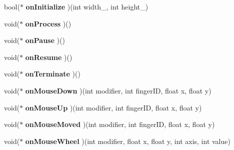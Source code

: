 \begin{DoxyCompactItemize}
\item 
bool($\ast$ {\bfseries on\+Initialize} )(int width\+\_\+, int height\+\_\+)\hypertarget{class_i_dream_sky_1_1_game_descriptor_a811074b2e3af8b6f2796cc12e2262558}{}\label{class_i_dream_sky_1_1_game_descriptor_a811074b2e3af8b6f2796cc12e2262558}

\item 
void($\ast$ {\bfseries on\+Process} )()\hypertarget{class_i_dream_sky_1_1_game_descriptor_a3cd631f41475569742acc622292d93b2}{}\label{class_i_dream_sky_1_1_game_descriptor_a3cd631f41475569742acc622292d93b2}

\item 
void($\ast$ {\bfseries on\+Pause} )()\hypertarget{class_i_dream_sky_1_1_game_descriptor_acfe288cb8ddebbda45ffce43866c4f3b}{}\label{class_i_dream_sky_1_1_game_descriptor_acfe288cb8ddebbda45ffce43866c4f3b}

\item 
void($\ast$ {\bfseries on\+Resume} )()\hypertarget{class_i_dream_sky_1_1_game_descriptor_a9b575075c02bb6d9798887bf6fd1f018}{}\label{class_i_dream_sky_1_1_game_descriptor_a9b575075c02bb6d9798887bf6fd1f018}

\item 
void($\ast$ {\bfseries on\+Terminate} )()\hypertarget{class_i_dream_sky_1_1_game_descriptor_a7265208792f533b42f68c478bac32feb}{}\label{class_i_dream_sky_1_1_game_descriptor_a7265208792f533b42f68c478bac32feb}

\item 
void($\ast$ {\bfseries on\+Mouse\+Down} )(int modifier, int finger\+ID, float x, float y)\hypertarget{class_i_dream_sky_1_1_game_descriptor_a827fde2a04858244047b43a227ddae04}{}\label{class_i_dream_sky_1_1_game_descriptor_a827fde2a04858244047b43a227ddae04}

\item 
void($\ast$ {\bfseries on\+Mouse\+Up} )(int modifier, int finger\+ID, float x, float y)\hypertarget{class_i_dream_sky_1_1_game_descriptor_a8dc9aaed3344af080aff7763c3e1f2f8}{}\label{class_i_dream_sky_1_1_game_descriptor_a8dc9aaed3344af080aff7763c3e1f2f8}

\item 
void($\ast$ {\bfseries on\+Mouse\+Moved} )(int modifier, int finger\+ID, float x, float y)\hypertarget{class_i_dream_sky_1_1_game_descriptor_acd7ea5617ac4159f63391a9503bcf11a}{}\label{class_i_dream_sky_1_1_game_descriptor_acd7ea5617ac4159f63391a9503bcf11a}

\item 
void($\ast$ {\bfseries on\+Mouse\+Wheel} )(int modifier, float x, float y, int axis, int value)\hypertarget{class_i_dream_sky_1_1_game_descriptor_a7aa2bcc532e2bbf5982a241d85fc8dd7}{}\label{class_i_dream_sky_1_1_game_descriptor_a7aa2bcc532e2bbf5982a241d85fc8dd7}


\end{DoxyCompactItemize}
